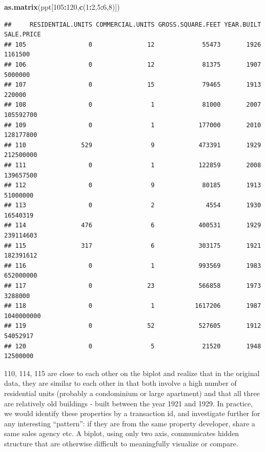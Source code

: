 \documentclass[]{article}
\newenvironment{Shaded}{\begin{snugshade}}{\end{snugshade}}
\newcommand{\DecValTok}[1]{\textcolor[rgb]{0.00,0.00,0.81}{#1}}
\newcommand{\KeywordTok}[1]{\textcolor[rgb]{0.13,0.29,0.53}{\textbf{#1}}}
\newcommand{\NormalTok}[1]{#1}
\newcommand{\OperatorTok}[1]{\textcolor[rgb]{0.81,0.36,0.00}{\textbf{#1}}}
\begin{document}
\begin{Shaded}
\begin{Highlighting}[]
\KeywordTok{as.matrix}\NormalTok{(ppt[}\DecValTok{105}\OperatorTok{:}\DecValTok{120}\NormalTok{,}\KeywordTok{c}\NormalTok{(}\DecValTok{1}\OperatorTok{:}\DecValTok{2}\NormalTok{,}\DecValTok{5}\OperatorTok{:}\DecValTok{6}\NormalTok{,}\DecValTok{8}\NormalTok{)])}
\end{Highlighting}
\end{Shaded}

\begin{verbatim}
##     RESIDENTIAL.UNITS COMMERCIAL.UNITS GROSS.SQUARE.FEET YEAR.BUILT SALE.PRICE
## 105                 0               12             55473       1926    1161500
## 106                 0               12             81375       1907    5000000
## 107                 0               15             79465       1913     220000
## 108                 0                1             81000       2007  105592700
## 109                 0                1            177000       2010  128177800
## 110               529                9            473391       1929  212500000
## 111                 0                1            122859       2008  139657500
## 112                 0                9             80185       1913   51000000
## 113                 0                2              4554       1930   16540319
## 114               476                6            400531       1929  239114603
## 115               317                6            303175       1921  182391612
## 116                 0                1            993569       1983  652000000
## 117                 0               23            566858       1973    3288000
## 118                 0                1           1617206       1987 1040000000
## 119                 0               52            527605       1912   54052917
## 120                 0                5             21520       1948   12500000
\end{verbatim}

110, 114, 115 are close to each other on the biplot and realize that in
the original data, they are similar to each other in that both involve a
high number of residential units (probably a condominium or large
apartment) and that all three are relatively old buildings - built
between the year 1921 and 1929. In practice, we would identify these
properties by a transaction id, and investigate further for any
interesting ``pattern'': if they are from the same property developer,
share a same sales agency etc. A biplot, using only two axis,
communicates hidden structure that are otherwise difficult to
meaningfully visualize or compare.
\end{document}
